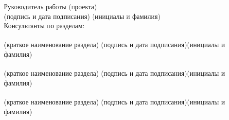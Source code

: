 \begin{titlepage}
\begin{flushleft}
Руководитель работы (проекта) \underline{\hspace{5cm}}\hfill\underline{
	\hspace{4cm}}\\
\vspace{-.2cm}\hspace{7.3cm}\footnotesize(подпись и дата подписания)
\hspace{2.2cm}(инициалы и фамилия)\normalsize\\
Консультанты по разделам:\\
\underline{\hspace{7.5cm}}\hspace{1cm}\underline{\hspace{4cm}}\hspace{1cm}
	\underline{\hspace{4cm}}\\
\vspace{-.2cm}\hspace{1.5cm}\footnotesize(краткое наименование раздела)
	\hspace{2cm}(подпись и дата подписания)\hspace{1.1cm}(инициалы и фамилия)
	\normalsize\\
\underline{\hspace{7.5cm}}\hspace{1cm}\underline{\hspace{4cm}}\hspace{1cm}
	\underline{\hspace{4cm}}\\
\vspace{-.2cm}\hspace{1.5cm}\footnotesize(краткое наименование раздела)
	\hspace{2cm}(подпись и дата подписания)\hspace{1.1cm}(инициалы и фамилия)
	\normalsize\\
\underline{\hspace{7.5cm}}\hspace{1cm}\underline{\hspace{4cm}}\hspace{1cm}
	\underline{\hspace{4cm}}\\
\vspace{-.2cm}\hspace{1.5cm}\footnotesize(краткое наименование раздела)
	\hspace{2cm}(подпись и дата подписания)\hspace{1.1cm}(инициалы и фамилия)

\end{flushleft}
\end{titlepage}
